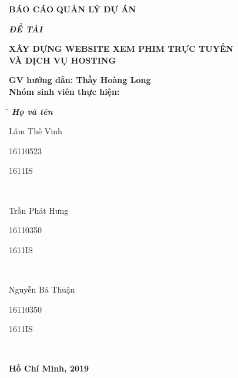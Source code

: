 \documentclass[a4paper]{book}
\begin{document}
\begin{titlepage}
\begin{center}
    \vspace{10pt}
    \fontsize{18pt}{17pt}\selectfont 
    \textbf{BÁO CÁO}
    \vspace{7pt}
    \textbf{QUẢN LÝ DỰ ÁN}
\end{center}
\begin{flushleft}
    \fontsize{14pt}{17pt}\selectfont  
    \textbf{\textsl{ĐỀ TÀI}}
\end{flushleft}
\begin{center}
    \fontsize{18pt}{17pt}\selectfont
    \textbf{XÂY DỰNG WEBSITE XEM PHIM TRỰC TUYẾN \\}
    \textbf{VÀ DỊCH VỤ HOSTING}
\end{center}
\textbf{GV hướng dẫn: Thầy Hoàng Long}
\\
\textbf{Nhóm sinh viên thực hiện:}
\begin{tabbing}
\hspace{8cm}\=\hspace{3cm}\=\hspace{3cm} \kill
{\it \textbf{Họ và tên}}\\
\begin{bfseries}Lâm Thế Vinh\end{bfseries}\> \begin{bfseries}16110523\end{bfseries}\> \begin{bfseries}1611IS\end{bfseries}\\
\begin{bfseries}Trần Phát Hưng\end{bfseries}\> \begin{bfseries}16110350\end{bfseries}\> \begin{bfseries}1611IS\end{bfseries}\\
\begin{bfseries}Nguyễn Bá Thuận\end{bfseries}\> \begin{bfseries}16110350\end{bfseries}\> \begin{bfseries}1611IS\end{bfseries}\\

\end{tabbing}
\begin{center}
    \textbf{Hồ Chí Minh, 2019}
\end{center}
\vspace{10pt}
\end{titlepage}
\tableofcontents
\end{document}
